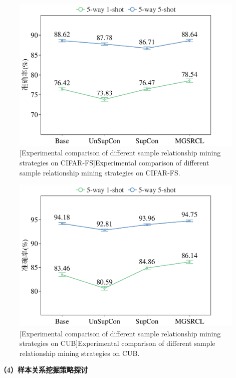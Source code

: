 \begin{figure}[h!]
  \centering
  \includegraphics[width=0.6\columnwidth]{figures/MGSRCL/CIFAR-FS/comparison.pdf}
  [Experimental comparison of different sample relationship mining strategies on CIFAR-FS]{Experimental comparison of different sample relationship mining strategies on CIFAR-FS.}
  \label{figure3: comparison(CIFAR-FS)}
\end{figure}

\begin{figure}[h!]
  \centering
  \includegraphics[width=0.6\columnwidth]{figures/MGSRCL/CUB/comparison.pdf}
  [Experimental comparison of different sample relationship mining strategies on CUB]{Experimental comparison of different sample relationship mining strategies on CUB.}
  \label{figure3: comparison(CUB)}
\end{figure}

\textbf{（4）样本关系挖掘策略探讨}

